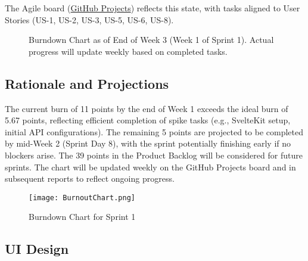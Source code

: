 \documentclass[12pt]{article}
\begin{document}
The Agile board (\href{https://github.com/users/ABSanthosh/projects/20/views/1}{GitHub Projects}) reflects this state, with tasks aligned to User Stories (US-1, US-2, US-3, US-5, US-6, US-8).

\begin{figure}[htbp]
  \centering
  \caption{Burndown Chart as of End of Week 3 (Week 1 of Sprint 1). Actual progress will update weekly based on completed tasks.}
  \label{fig:burndown}
\end{figure}

\subsection{Rationale and Projections}
The current burn of 11 points by the end of Week 1 exceeds the ideal burn of 5.67 points, reflecting efficient completion of spike tasks (e.g., SvelteKit setup, initial API configurations). The remaining 5 points are projected to be completed by mid-Week 2 (Sprint Day 8), with the sprint potentially finishing early if no blockers arise. The 39 points in the Product Backlog will be considered for future sprints. The chart will be updated weekly on the GitHub Projects board and in subsequent reports to reflect ongoing progress.
\begin{figure}[htbp]
  \centering
  \texttt{[image: BurnoutChart.png]}
  \caption{Burndown Chart for Sprint 1}
  \label{fig:burndownChart}
\end{figure}

\subsection{UI Design}
\end{document}
